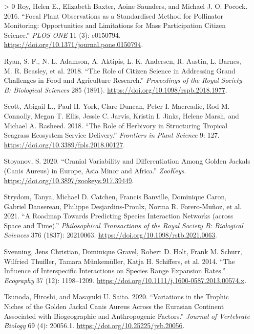 \documentclass[11pt]{article}
\newlength{\cslhangindent}
\newenvironment{CSLReferences}[3] %
 {%
  \setlength{\parindent}{0pt}
  \ifodd #1 \everypar{\setlength{\hangindent}{\cslhangindent}}\ignorespaces\fi
  \ifnum #2 > 0
  \setlength{\parskip}{#2\baselineskip}
  \fi
 }%
 {}
\begin{document}
\begin{CSLReferences}{1}{0}
\leavevmode\hypertarget{ref-Roy2016FocPla}{}%
Roy, Helen E., Elizabeth Baxter, Aoine Saunders, and Michael J. O.
Pocock. 2016. {``Focal Plant Observations as a Standardised Method for
Pollinator Monitoring: Opportunities and Limitations for Mass
Participation Citizen Science.''} \emph{PLOS ONE} 11 (3): e0150794.
\url{https://doi.org/10.1371/journal.pone.0150794}.

\leavevmode\hypertarget{ref-Ryan2018RolCit}{}%
Ryan, S. F., N. L. Adamson, A. Aktipis, L. K. Andersen, R. Austin, L.
Barnes, M. R. Beasley, et al. 2018. {``The Role of Citizen Science in
Addressing Grand Challenges in Food and Agriculture Research.''}
\emph{Proceedings of the Royal Society B: Biological Sciences} 285
(1891). \url{https://doi.org/10.1098/rspb.2018.1977}.

\leavevmode\hypertarget{ref-Scott2018RolHer}{}%
Scott, Abigail L., Paul H. York, Clare Duncan, Peter I. Macreadie, Rod
M. Connolly, Megan T. Ellis, Jessie C. Jarvis, Kristin I. Jinks, Helene
Marsh, and Michael A. Rasheed. 2018. {``The Role of Herbivory in
Structuring Tropical Seagrass Ecosystem Service Delivery.''}
\emph{Frontiers in Plant Science} 9: 127.
\url{https://doi.org/10.3389/fpls.2018.00127}.

\leavevmode\hypertarget{ref-Stoyanov2020CraVar}{}%
Stoyanov, S. 2020. {``Cranial Variability and Differentiation Among
Golden Jackals (Canis Aureus) in Europe, Asia Minor and Africa.''}
\emph{ZooKeys}. \url{https://doi.org/10.3897/zookeys.917.39449}.

\leavevmode\hypertarget{ref-Strydom2021RoaPre}{}%
Strydom, Tanya, Michael D. Catchen, Francis Banville, Dominique Caron,
Gabriel Dansereau, Philippe Desjardins-Proulx, Norma R. Forero-Muñoz, et
al. 2021. {``A Roadmap Towards Predicting Species Interaction Networks
(across Space and Time).''} \emph{Philosophical Transactions of the
Royal Society B: Biological Sciences} 376 (1837): 20210063.
\url{https://doi.org/10.1098/rstb.2021.0063}.

\leavevmode\hypertarget{ref-Svenning2014InfInt}{}%
Svenning, Jens Christian, Dominique Gravel, Robert D. Holt, Frank M.
Schurr, Wilfried Thuiller, Tamara Münkemüller, Katja H. Schiffers, et
al. 2014. {``The Influence of Interspecific Interactions on Species
Range Expansion Rates.''} \emph{Ecography} 37 (12): 1198--1209.
\url{https://doi.org/10.1111/j.1600-0587.2013.00574.x}.

\leavevmode\hypertarget{ref-Tsunoda2020VarTro}{}%
Tsunoda, Hiroshi, and Masayuki U. Saito. 2020. {``Variations in the
Trophic Niches of the Golden Jackal Canis Aureus Across the Eurasian
Continent Associated with Biogeographic and Anthropogenic Factors.''}
\emph{Journal of Vertebrate Biology} 69 (4): 20056.1.
\url{https://doi.org/10.25225/jvb.20056}.


\end{CSLReferences}
\end{document}
